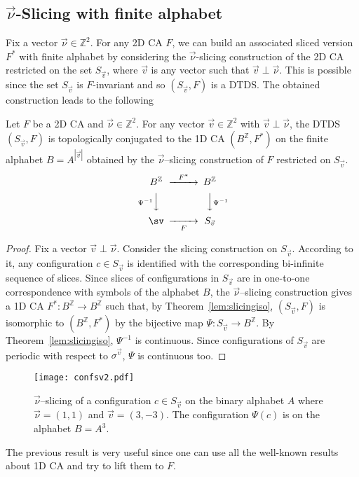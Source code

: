 \documentclass{llncs}
\newcommand{\z}{\ensuremath{\mathbb{Z}}\xspace}
\newcommand{\sv}{S_{\vec v}}
\newcommand{\zdu}{\ensuremath{\mathbb{Z}^2}\xspace}
\newcommand{\para}[1]{(#1)}
\newcommand{\nn}{\vec\nu}
\newcommand{\vv}{\vec v}
\begin{document}
\subsection{$\nn$-Slicing with finite alphabet}
Fix a vector $\nn\in\zdu$. For any 2D CA $F$, we can build an
associated sliced version $F^*$ with finite alphabet by
considering the $\nn$-slicing construction of the 2D CA restricted
on the set $\sv$, where $\vv$ is any vector such that
$\vv\perp\nn$. This is possible since the set $\sv$ is
$F$-invariant and so $(\sv,F)$ is a DTDS. The obtained
construction leads to the following
\begin{theorem}\label{lem:bz1d}
Let $F$ be a 2D CA and $\nn\in\zdu$. For any vector $\vv\in\zdu$
with $\vv\perp\nn$, the DTDS $\para{\sv, F}$ is topologically
conjugated to the 1D CA $\para{B^{\z}, F^*}$ on the finite
alphabet $B=A^{|\vv|}$ obtained by the $\nn$--slicing construction
of $F$ restricted on $\sv$.
\[
\begin{CD}
   B^{\z}@>F^*>>&B^{\z}\\
   @V{\Psi^{-1}}VV&@VV{\Psi^{-1}}V\\
   \sv@>>F>&\sv
\end{CD}
\]
\end{theorem}
\begin{proof}
Fix a vector $\vv\perp\nn$. Consider the slicing construction on
$\sv$. According to it, any configuration $c\in\sv$ is identified
with the corresponding bi-infinite sequence of slices. Since
slices of configurations in $\sv$ are in one-to-one correspondence
with symbols of the alphabet $B$, the $\nn$--slicing construction
gives a 1D CA $F^*:B^{\z}\to B^{\z}$ such that, by
Theorem~\ref{lem:slicingiso}, $\para{\sv, F}$ is isomorphic to
$\para{B^{\z}, F^*}$ by the bijective map $\Psi:\sv\to B^{\z}$. By
Theorem~\ref{lem:slicingiso}, $\Psi^{-1}$ is continuous. Since
configurations of $\sv$ are periodic with respect to
$\sigma^{\vv}$, $\Psi$ is continuous too.\end{proof}
\begin{figure}[!htb]
  \begin{center}
     \texttt{[image: confsv2.pdf]}
   \end{center}
   \caption{$\nn$--slicing of a configuration $c\in\sv$
   on the binary alphabet $A$ where $\nn=(1,1)$ and
   $\vv=(3,-3)$. The configuration $\Psi(c)$ is on the alphabet $B=A^3$.}
   \label{fig:slifinito}
\end{figure}
The previous result is very useful since one can use all the
well-known results about 1D CA and try to lift them to $F$.
\end{document}
